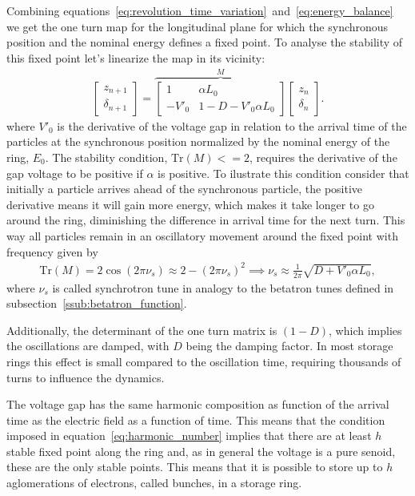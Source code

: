 \documentclass[
	12pt,				%
	openright,			%
	oneside,			%
	a4paper,		%
	chapter=TITLE,		%
	section=TITLE,		%
    brazil,				%
	english,			%
	sumario=tradicional,
	]{abntex2}
\begin{document}
	Combining equations~\eqref{eq:revolution_time_variation}~and~\eqref{eq:energy_balance} we get the one turn map for the longitudinal plane for which the synchronous position and the nominal energy defines a fixed point. To analyse the stability of this fixed point let's linearize the map in its vicinity:
	\begin{align}
		\begin{bmatrix} z_{n+1} \\ \delta_{n+1}\end{bmatrix} = \overbrace{
			\begin{bmatrix} 1 & \alpha L_0 \\ -V'_0 & 1-D - V'_0\alpha L_0 \end{bmatrix}
		}^M \begin{bmatrix} z_n \\ \delta_n \end{bmatrix}.
	\end{align}
	where $V'_0$ is the derivative of the voltage gap in relation to the arrival time of the particles at the synchronous position normalized by the nominal energy of the ring, $E_0$. The stability condition, $\text{Tr}(M) <= 2$, requires the derivative of the gap voltage to be positive if $\alpha$ is positive. To ilustrate this condition consider that initially a particle arrives ahead of the synchronous particle, the positive derivative means it will gain more energy, which makes it take longer to go around the ring, diminishing the difference in arrival time for the next turn. This way all particles remain in an oscillatory movement around the fixed point with frequency given by
	\begin{align}
		\text{Tr}(M) = 2\cos(2\pi\nu_s) \approx 2-(2\pi\nu_s)^2 \implies
		\nu_s \approx \frac{1}{2\pi}\sqrt{D+V'_0\alpha L_0},
	\end{align}
	where $\nu_s$ is called synchrotron tune in analogy to the betatron tunes defined in subsection~\ref{ssub:betatron_function}.

	Additionally, the determinant of the one turn matrix is $(1-D)$, which implies the oscillations are damped, with $D$ being the damping factor. In most storage rings this effect is small compared to the oscillation time, requiring thousands of turns to influence the dynamics.

	The voltage gap has the same harmonic composition as function of the arrival time as the electric field as a function of time. This means that the condition imposed in equation~\eqref{eq:harmonic_number} implies that there are at least $h$ stable fixed point along the ring and, as in general the voltage is a pure senoid, these are the only stable points. This means that it is possible to store up to $h$ aglomerations of electrons, called bunches, in a storage ring.
\end{document}
